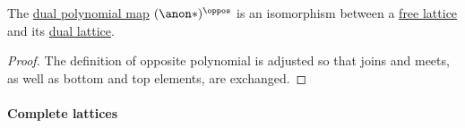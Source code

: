 \begin{proposition}\label{thm:free_lattice_opposite}
  The \hyperref[def:dual_lattice_polynomial]{dual polynomial map} \( (\anon*)^\oppos \) is an isomorphism between a \hyperref[def:free_lattice]{free lattice} and its \hyperref[def:lattice/opposite]{dual lattice}.
\end{proposition}
\begin{proof}
  The definition of opposite polynomial is adjusted so that joins and meets, as well as bottom and top elements, are exchanged.
\end{proof}

\paragraph{Complete lattices}

